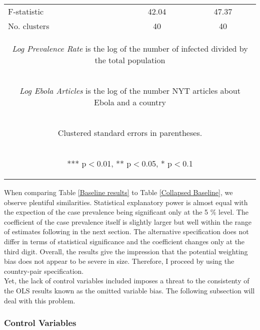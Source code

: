 \documentclass{article}
\begin{document}
\begin{table}[htbp]
\begin{tabular}{lcc}
F-statistic & 42.04 & 47.37 \\
No. clusters & 40 & 40 \\ \hline
\multicolumn{3}{c}{\begin{footnotesize} \textit{Log Prevalence Rate} is the log of the number of infected divided by the total population \end{footnotesize} }\\
\multicolumn{3}{c}{\begin{footnotesize} \textit{Log Ebola Articles} is the log of the number NYT articles about Ebola and a country \end{footnotesize} }\\
\multicolumn{3}{c}{\begin{footnotesize} Clustered standard errors in parentheses. \end{footnotesize} }\\
\multicolumn{3}{c}{\begin{footnotesize} *** p$<$0.01, ** p$<$0.05, * p$<$0.1\end{footnotesize}} \\
\end{tabular}
\end{table}

When comparing Table \ref{Baseline results} to Table \ref{Collapsed Baseline}, we observe plentiful similarities. Statistical explanatory power is almost equal with the expection of the case prevalence being significant only at the 5 \% level. The coefficient of the case prevalence itself is slightly larger but well within the range of estimates following in the next section. The alternative specification does not differ in terms of statistical significance and the coefficient changes only at the third digit. Overall, the results give the impression that the potential weighting bias does not appear to be severe in size. Therefore, I proceed by using the country-pair specification. \\
Yet, the lack of control variables included imposes a threat to the consistenty of the OLS results known as the omitted variable bias. The following subsection will deal with this problem.

\subsubsection{Control Variables}
\end{document}
